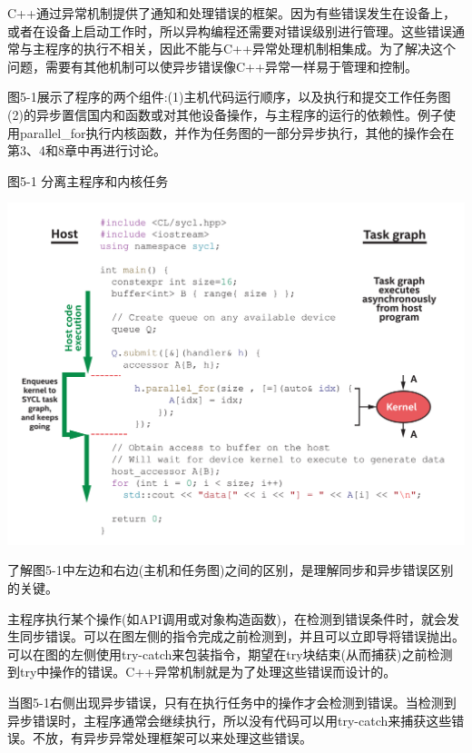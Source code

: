 C++通过异常机制提供了通知和处理错误的框架。因为有些错误发生在设备上，或者在设备上启动工作时，所以异构编程还需要对错误级别进行管理。这些错误通常与主程序的执行不相关，因此不能与C++异常处理机制相集成。为了解决这个问题，需要有其他机制可以使异步错误像C++异常一样易于管理和控制。\par

图5-1展示了程序的两个组件:(1)主机代码运行顺序，以及执行和提交工作任务图(2)的异步置信国内和函数或对其他设备操作，与主程序的运行的依赖性。例子使用parallel\_for执行内核函数，并作为任务图的一部分异步执行，其他的操作会在第3、4和8章中再进行讨论。\par

\hspace*{\fill} \par %
图5-1 分离主程序和内核任务
\begin{center}
	\includegraphics[width=1.0\textwidth]{content/chapter-5/images/2}
\end{center}

了解图5-1中左边和右边(主机和任务图)之间的区别，是理解同步和异步错误区别的关键。\par

主程序执行某个操作(如API调用或对象构造函数)，在检测到错误条件时，就会发生同步错误。可以在图左侧的指令完成之前检测到，并且可以立即导将错误抛出。可以在图的左侧使用try-catch来包装指令，期望在try块结束(从而捕获)之前检测到try中操作的错误。C++异常机制就是为了处理这些错误而设计的。\par

当图5-1右侧出现异步错误，只有在执行任务中的操作才会检测到错误。当检测到异步错误时，主程序通常会继续执行，所以没有代码可以用try-catch来捕获这些错误。不放，有异步异常处理框架可以来处理这些错误。\par











